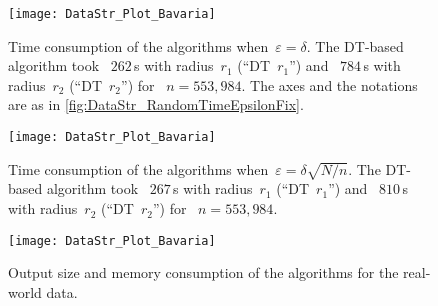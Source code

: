 \begin{figure}[ht]	
\centering
\texttt{[image: DataStr\_Plot\_Bavaria]}
\vspace{-3mm}
\caption{Time consumption of the algorithms 
	when~$\varepsilon=\delta$. 
	The DT-based algorithm took~  
	$262\,$s with radius~$r_1$ (``DT~$r_1$'') and~  
	$784\,$s with radius~$r_2$ (``DT~$r_2$'') for~
    $n=553{,}984$. 
	The axes and the notations are as in 
	\fig\ref{fig:DataStr_RandomTimeEpsilonFix}.}
\label{fig:DataStr_BavariaTimeEpsilonFix}
%	
\vspace{5.5mm}
%
\centering
\texttt{[image: DataStr\_Plot\_Bavaria]}
\vspace{-3mm}
\caption{Time consumption of the algorithms 
	when~$\varepsilon=\delta\sqrt{N/n}$. 
	The DT-based algorithm took~ 
	$267\,$s with radius~$r_1$ (``DT~$r_1$'') and~  
	$810\,$s with radius~$r_2$ (``DT~$r_2$'') for~ 
	$n=553{,}984$.}
\label{fig:DataStr_BavariaTimeEpsilonDecrease}
\end{figure}

\begin{figure}[tb]	
\centering
\texttt{[image: DataStr\_Plot\_Bavaria]}
\vspace{-6mm}
\caption{Output size and memory consumption 
	of the algorithms for the real-world data.}
\label{fig:DataStr_BavariaMemory}
\end{figure}